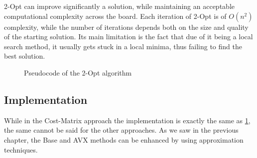 2-Opt can improve significantly a solution, while maintaining an acceptable computational complexity across the board.
Each iteration of 2-Opt is of $O(n^2)$ complexity, while the number of iterations depends both on the size and quality of the starting solution.
Its main limitation is the fact that due of it being a local search method, it usually gets stuck in a local minima, thus failing to find the best solution.

\begin{figure}[htbp]
    \begin{algorithm}[H]
        \BlankLine
    \end{algorithm}
    \caption{Pseudocode of the 2-Opt algorithm} 
    \label{fig:2OptPseudocode}
\end{figure}

\subsection{Implementation}

While in the Cost-Matrix approach the implementation is exactly the same as \figurename{ \ref{fig:2OptPseudocode}}, the same cannot be said for the other approaches.
As we saw in the previous chapter, the Base and AVX methods can be enhanced by using approximation techniques.


